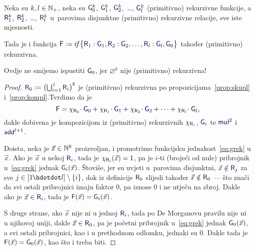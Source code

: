 \begin{teorem}\label{tm:grek}
Neka su $k,l\in{\mathbb N}_+$, neka su $\f G_0^k$, $\f G_1^k$, $\f G_2^k$,~\ldots, $\f G_l^k$ (primitivno) rekurzivne funkcije, a $\f R_1^k$, $\f R_2^k$,~\ldots, $\f R_l^k$ u~parovima disjunktne (primitivno) rekurzivne relacije, sve iste mjesnosti.

	Tada je i funkcija $\f F:=\IF{\f R_1:\f G_1,\f R_2:\f G_2,\dots,\f R_l:\f G_l,\f G_0}$ također (primitivno) rekurzivna.
\end{teorem}

Ovdje ne smijemo ispustiti $\f G_0$, jer $\varnothing^k$ nije (primitivno) rekurzivna!

\begin{proof}
$\f R_0:=\bigl(\bigcup\nolimits_{i=1}^{\,l}\f R_i\bigr)\kompl$ je (primitivno) rekurzivna po propozicijama~\ref{prop:skupl} i~\ref{prop:kompl}.\newline Tvrdimo da je
\begin{equation}\label{eq:grek}
    \f F=\chi_{\f R_0}\!\cdot \f G_0+\chi_{\f R_1}\!\cdot \f G_1+\chi_{\f R_2}\!\cdot \f G_2+\dotsb+\chi_{\f R_l}\!\cdot\f G_l\text,
\end{equation}
dakle dobivena je kompozicijom iz (primitivno) rekurzivnih $\chi_{\f R_i}$, $\f G_i$ te $\f{mul}^2$ i $\f{add}^{l+1}$.

	Doista, neka je $\vec x\in{\mathbb N}^k$ proizvoljan, i promotrimo funkcijsku jednakost~\eqref{eq:grek} u $\vec x$. Ako je $\vec x$ u nekoj $\f R_i$, tada je $\chi_{\f R_i}(\vec x)=1$, pa je $i$-ti (brojeći od nule) pribrojnik u~\eqref{eq:grek} jednak $\f G_i(\vec x)$. Štoviše, jer su uvjeti u~parovima disjunktni, $\vec x\notin\f R_j$ za sve $j\in[1\mspace{-1mu}\dd l]\setminus\{i\}$, dok iz definicije $\f R_0$ slijedi također $\vec x\notin\f R_0$ --- što znači da svi ostali pribrojnici imaju faktor $0$, pa iznose $0$ i ne utječu na zbroj. Dakle ako je $\vec x\in\f R_i$, tada je $\f F(\vec x)=\f G_i(\vec x)$.

S druge strane, ako $\vec x$ nije ni u jednoj $\f R_i$, tada po De Morganovu pravilu nije ni u njihovoj uniji, dakle $\vec x\in\f R_0$, pa je početni pribrojnik u~\eqref{eq:grek} jednak $\f G_0(\vec x)$, a svi ostali pribrojnici, kao i u prethodnom odlomku, jednaki su $0$. Dakle tada je $\f F(\vec x)=\f G_0(\vec x)$, kao što i treba biti.
\end{proof}

